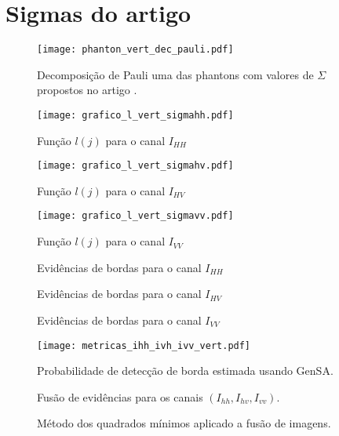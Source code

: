 \section{Sigmas do artigo}
\begin{figure}[hbt]
\centering
	\texttt{[image: phanton\_vert\_dec\_pauli.pdf]}
	\caption{Decomposição de Pauli uma das phantons com valores de $\Sigma$ propostos no artigo \citep{gamf}.}\label{cap_acf_fig01}
\end{figure}
\begin{figure}[hbt]
  \texttt{[image: grafico\_l\_vert\_sigmahh.pdf]}
	\caption{Função $l(j)$ para o canal $I_{HH}$}\label{cap_acf_fig04}
\endminipage\hfill
{}
  \texttt{[image: grafico\_l\_vert\_sigmahv.pdf]}
	\caption{Função $l(j)$ para o canal $I_{HV}$}\label{cap_acf_fig05}
\endminipage\hfill
\centering
{}
  \texttt{[image: grafico\_l\_vert\_sigmavv.pdf]}
	\caption{Função $l(j)$ para o canal $I_{VV}$}\label{cap_acf_fig06}
\endminipage\hfill
\end{figure}
\begin{figure}[hbt]
\caption{Evidências de bordas para o canal $I_{HH}$}\label{cap_acf_fig07}
\endminipage\hfill
{}
\caption{Evidências de bordas para o canal $I_{HV}$}\label{cap_acf_fig08}
\endminipage\hfill
\centering
{}
\caption{Evidências de bordas para o canal $I_{VV}$}\label{cap_acf_fig09}
\endminipage\hfill
\end{figure}
\begin{figure}[hbt]
\centering
	\texttt{[image: metricas\_ihh\_ivh\_ivv\_vert.pdf]}
	\caption{Probabilidade de detecção de borda estimada usando GenSA.}
\label{cap_acf_fig10}
\end{figure}
%
\begin{figure}[hbt]
	\caption{Fusão de evidências para os canais $\left(I_{hh}, I_{hv}, I_{vv}\right)$.}
\label{cap_acf_fig11}
\endminipage\hfill
{}
\caption{Método dos quadrados mínimos aplicado a fusão de imagens.}
\label{cap_acf_fig12}
\endminipage\hfill
\end{figure}
